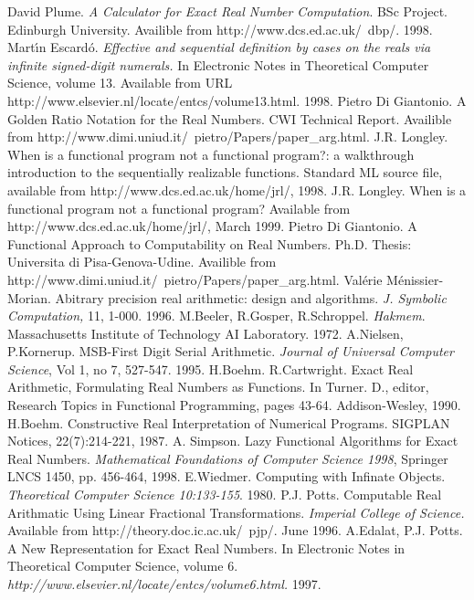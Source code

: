 \documentclass{cs4rep}
\begin{document}
\begin{thebibliography}{20}
 David Plume. {\em A Calculator for Exact Real Number Computation}. BSc Project. Edinburgh University. Availible from http://www.dcs.ed.ac.uk/~dbp/. 1998.
 Mart\' \i n Escard\'o. {\em Effective and sequential definition by cases on the reals via infinite signed-digit numerals.} In Electronic Notes in Theoretical Computer Science, volume 13. Available from URL http://www.elsevier.nl/locate/entcs/volume13.html. 1998.
 Pietro Di Giantonio. A Golden Ratio Notation for the Real Numbers. CWI Technical Report. Availible from http://www.dimi.uniud.it/~pietro/Papers/paper\_arg.html.
 J.R. Longley. When is a functional program not a functional program?: a walkthrough introduction to the sequentially realizable functions. Standard ML source file, available from http://www.dcs.ed.ac.uk/home/jrl/, 1998.
 J.R. Longley. When is a functional program not a functional program? Available from http://www.dcs.ed.ac.uk/home/jrl/, March 1999.
 Pietro Di Giantonio. A Functional Approach to Computability on Real Numbers. Ph.D. Thesis: Universita di Pisa-Genova-Udine. Availible from http://www.dimi.uniud.it/~pietro/Papers/paper\_arg.html. 
 Val\'erie M\'enissier-Morian. Abitrary precision real arithmetic: design and algorithms. {\em J. Symbolic Computation,} 11, 1-000. 1996.
 M.Beeler, R.Gosper, R.Schroppel. {\em Hakmem}. Massachusetts Institute of Technology AI Laboratory. 1972.
 A.Nielsen, P.Kornerup. MSB-First Digit Serial Arithmetic. {\em Journal of Universal Computer Science}, Vol 1, no 7, 527-547. 1995.
 H.Boehm. R.Cartwright. Exact Real Arithmetic, Formulating Real Numbers as Functions. In Turner. D., editor, Research Topics in Functional Programming, pages 43-64. Addison-Wesley, 1990.
 H.Boehm. Constructive Real Interpretation of Numerical Programs. SIGPLAN Notices, 22(7):214-221, 1987.
 A. Simpson. Lazy Functional Algorithms for Exact Real Numbers. {\em Mathematical Foundations of Computer Science 1998}, Springer LNCS 1450, pp. 456-464, 1998.
 E.Wiedmer. Computing with Infinate Objects. {\em Theoretical Computer Science 10:133-155}. 1980.
 P.J. Potts. Computable Real Arithmatic Using Linear Fractional Transformations. {\em Imperial College of Science.} Available from http://theory.doc.ic.ac.uk/~pjp/. June 1996.
 A.Edalat, P.J. Potts. A New Representation for Exact Real Numbers. In Electronic Notes in Theoretical Computer Science, volume 6. {\em http://www.elsevier.nl/locate/entcs/volume6.html.} 1997.

\end{thebibliography}
\end{document}
